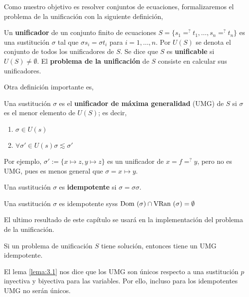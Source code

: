Como nuestro objetivo es resolver conjuntos de ecuaciones,
formalizaremos el problema de la unificación con la siguiente definición,

\begin{defi}
  Un \textbf{unificador} de un conjunto finito de ecuaciones
  $S = \{ s_1 =^? t_1, \dots, s_n =^? t_n\}$ es una sustitución $\sigma$
  tal que $\sigma s_i = \sigma t_i$ para $i = 1, \dots, n.$ Por $U(S)$
  se denota el conjunto de todos los unificadores de $S$. Se dice que
  $S$ es \textbf{unificable} si $U(S) \neq \emptyset$. El
  \textbf{problema de la unificación} de $S$ consiste en calcular sus
  unificadores.
\end{defi}

Otra definición importante es,

\begin{defi} 
  Una sustitución $\sigma$ es el \textbf{unificador de máxima
    generalidad} (UMG) de $S$ si $\sigma$ es el menor elemento de
  $U(S)$; es decir,
  \begin{enumerate}
  \item $\sigma \in U(s)$
  \item $\forall \sigma' \in U(s) \sigma \lesssim \sigma'$
  \end{enumerate}
\end{defi}

Por ejemplo, $\sigma ' := \{ x \mapsto z, y \mapsto z \}$ es un
unificador de $x=f =^? y$, pero no es UMG, pues es menos general que
$\sigma = {x \mapsto y}$.

\begin{defi}
  Una sustitución $\sigma$ es \textbf{idempotente} si $\sigma = \sigma \sigma$.
\end{defi}

\begin{lema} \label{lema:3.2} Una sustitución $\sigma$ es idempotente
  syss $\mbox{Dom }(\sigma) \cap \mbox{VRan }(\sigma) = \emptyset $
\end{lema}

El ultimo resultado de este capítulo se usará en la implementación del
problema de la unificación.

\begin{teor}
  Si un problema de unificación $S$ tiene solución, entonces tiene un
  UMG idempotente.
\end{teor}

\begin{demo} %
  El lema \ref{lema:3.1} nos dice que los UMG son únicos respecto a
  una sustitución $p$ inyectiva y biyectiva para las variables. Por
  ello, incluso para los idempotentes UMG no serán únicos.
\end{demo}

